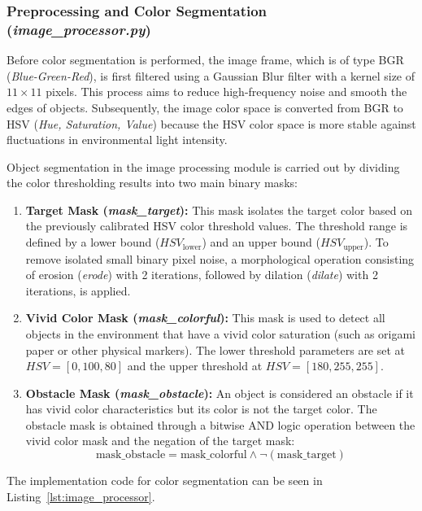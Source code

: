 \subsubsection{Preprocessing and Color Segmentation (\textit{image\_processor.py})}
Before color segmentation is performed, the image frame, which is of type BGR (\textit{Blue-Green-Red}), is first filtered using a Gaussian Blur filter with a kernel size of $11 \times 11$ pixels. This process aims to reduce high-frequency noise and smooth the edges of objects. Subsequently, the image color space is converted from BGR to HSV (\textit{Hue, Saturation, Value}) because the HSV color space is more stable against fluctuations in environmental light intensity.

Object segmentation in the image processing module is carried out by dividing the color thresholding results into two main binary masks:
\begin{enumerate}
    \item \textbf{Target Mask (\textit{mask\_target}):} This mask isolates the target color based on the previously calibrated HSV color threshold values. The threshold range is defined by a lower bound ($HSV_{\text{lower}}$) and an upper bound ($HSV_{\text{upper}}$). To remove isolated small binary pixel noise, a morphological operation consisting of erosion (\textit{erode}) with 2 iterations, followed by dilation (\textit{dilate}) with 2 iterations, is applied.
    \item \textbf{Vivid Color Mask (\textit{mask\_colorful}):} This mask is used to detect all objects in the environment that have a vivid color saturation (such as origami paper or other physical markers). The lower threshold parameters are set at $HSV = [0, 100, 80]$ and the upper threshold at $HSV = [180, 255, 255]$.
    \item \textbf{Obstacle Mask (\textit{mask\_obstacle}):} An object is considered an obstacle if it has vivid color characteristics but its color is not the target color. The obstacle mask is obtained through a bitwise AND logic operation between the vivid color mask and the negation of the target mask:
    \begin{equation}
        \text{mask\_obstacle} = \text{mask\_colorful} \land \neg(\text{mask\_target})
        \label{eq:bitwise_obstacle}
    \end{equation}
\end{enumerate}
The implementation code for color segmentation can be seen in Listing~\ref{lst:image_processor}.

